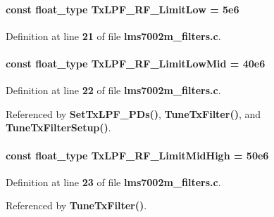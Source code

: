 \paragraph[{Tx\+L\+P\+F\+\_\+\+R\+F\+\_\+\+Limit\+Low}]{\setlength{\rightskip}{0pt plus 5cm}const {\bf float\+\_\+type} Tx\+L\+P\+F\+\_\+\+R\+F\+\_\+\+Limit\+Low = 5e6\hspace{0.3cm}{\ttfamily [static]}}\label{lms7002m__filters_8c_a41b5f1e72a489822ffaf4e499c7b9154}


Definition at line {\bf 21} of file {\bf lms7002m\+\_\+filters.\+c}.

\paragraph[{Tx\+L\+P\+F\+\_\+\+R\+F\+\_\+\+Limit\+Low\+Mid}]{\setlength{\rightskip}{0pt plus 5cm}const {\bf float\+\_\+type} Tx\+L\+P\+F\+\_\+\+R\+F\+\_\+\+Limit\+Low\+Mid = 40e6\hspace{0.3cm}{\ttfamily [static]}}\label{lms7002m__filters_8c_ad60dd3989e72e40be2270ae4be4f277d}


Definition at line {\bf 22} of file {\bf lms7002m\+\_\+filters.\+c}.



Referenced by {\bf Set\+Tx\+L\+P\+F\+\_\+\+P\+Ds()}, {\bf Tune\+Tx\+Filter()}, and {\bf Tune\+Tx\+Filter\+Setup()}.

\paragraph[{Tx\+L\+P\+F\+\_\+\+R\+F\+\_\+\+Limit\+Mid\+High}]{\setlength{\rightskip}{0pt plus 5cm}const {\bf float\+\_\+type} Tx\+L\+P\+F\+\_\+\+R\+F\+\_\+\+Limit\+Mid\+High = 50e6\hspace{0.3cm}{\ttfamily [static]}}\label{lms7002m__filters_8c_a8b82d455baafae9bb1da212cae9cff71}


Definition at line {\bf 23} of file {\bf lms7002m\+\_\+filters.\+c}.



Referenced by {\bf Tune\+Tx\+Filter()}.

